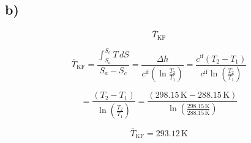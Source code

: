 

\subsection*{b)}

\[
\overline{T}_{\text{KF}}
\]

\[
\overline{T}_{\text{KF}} = \frac{\int_{S_a}^{S_c} T \, dS}{S_a - S_c} = \frac{\Delta h}{c^{\text{if}} \left( \ln \frac{T_2}{T_1} \right)} = \frac{c^{\text{if}} (T_2 - T_1)}{c^{\text{if}} \ln \left( \frac{T_2}{T_1} \right)}
\]

\[
= \frac{(T_2 - T_1)}{\ln \left( \frac{T_2}{T_1} \right)} = \frac{(298.15 \, \text{K} - 288.15 \, \text{K})}{\ln \left( \frac{298.15 \, \text{K}}{288.15 \, \text{K}} \right)}
\]

\[
\overline{T}_{\text{KF}} = 293.12 \, \text{K}
\]